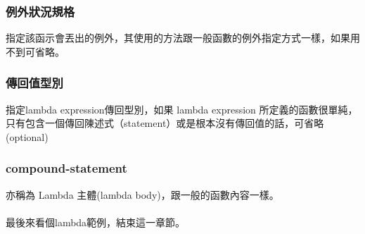 \subsubsection{例外狀況規格}
指定該函示會丟出的例外，其使用的方法跟一般函數的例外指定方式一樣，如果用不到可省略。
\subsubsection{傳回值型別}
指定lambda expression傳回型別，如果 lambda expression 所定義的函數很單純，只有包含一個傳回陳述式（statement）或是根本沒有傳回值的話，可省略(optional)
\subsubsection{compound-statement}
亦稱為 Lambda 主體(lambda body)，跟一般的函數內容一樣。\\ \\
最後來看個lambda範例，結束這一章節。

